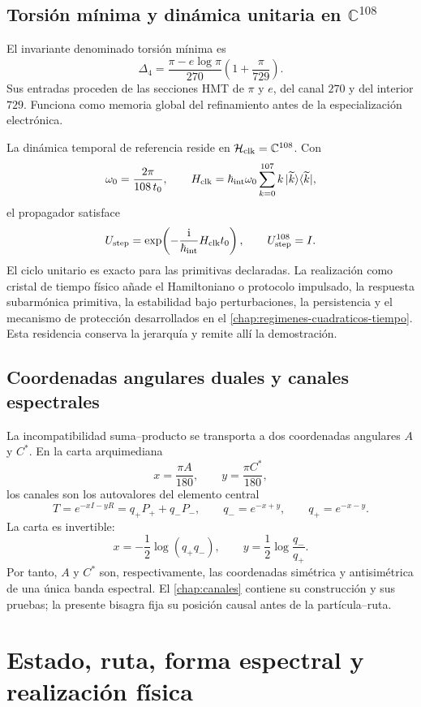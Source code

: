 \subsection{Torsión mínima y dinámica unitaria en \texorpdfstring{\(\mathbb C^{108}\)}{C108}}

El invariante denominado torsión mínima es
\[
 \Delta_4
 =
 \frac{\pi-e\log\pi}{270}
 \left(1+\frac{\pi}{729}\right).
\]
Sus entradas proceden de las secciones HMT de \(\pi\) y \(e\), del canal
\(270\) y del interior \(729\). Funciona como memoria global del
refinamiento antes de la especialización electrónica.

La dinámica temporal de referencia reside en
\(\mathcal H_{\rm clk}=\mathbb C^{108}\). Con
\[
 \omega_0=\frac{2\pi}{108\,t_0},
 \qquad
 H_{\rm clk}
 =\hbar_{\rm int}\omega_0
 \sum_{k=0}^{107}k\,|\widetilde k\rangle
 \langle\widetilde k|,
\]
el propagador satisface
\[
 U_{\rm step}
 =\exp\!\left(-\frac{\mathrm i}{\hbar_{\rm int}}
 H_{\rm clk}t_0\right),
 \qquad
 U_{\rm step}^{108}=I.
\]
El ciclo unitario es exacto para las primitivas declaradas. La realización
como cristal de tiempo físico añade el Hamiltoniano o protocolo impulsado,
la respuesta subarmónica primitiva, la estabilidad bajo perturbaciones, la
persistencia y el mecanismo de protección desarrollados en el
\cref{chap:regimenes-cuadraticos-tiempo}. Esta residencia conserva la
jerarquía y remite allí la demostración.

\subsection{Coordenadas angulares duales y canales espectrales}

La incompatibilidad suma--producto se transporta a dos coordenadas angulares
\(A\) y \(C^*\). En la carta arquimediana
\[
 x=\frac{\pi A}{180},
 \qquad
 y=\frac{\pi C^*}{180},
\]
los canales son los autovalores del elemento central
\[
 T=e^{-xI-yR}=q_+P_++q_-P_-,
 \qquad
 q_-=e^{-x+y},
 \qquad
 q_+=e^{-x-y}.
\]
La carta es invertible:
\[
 x=-\frac12\log(q_+q_-),
 \qquad
 y=\frac12\log\frac{q_-}{q_+}.
\]
Por tanto, \(A\) y \(C^*\) son, respectivamente, las coordenadas simétrica y
antisimétrica de una única banda espectral. El
\cref{chap:canales} contiene su construcción y sus pruebas; la
presente bisagra fija su posición causal antes de la partícula--ruta.

\section{Estado, ruta, forma espectral y realización física}

